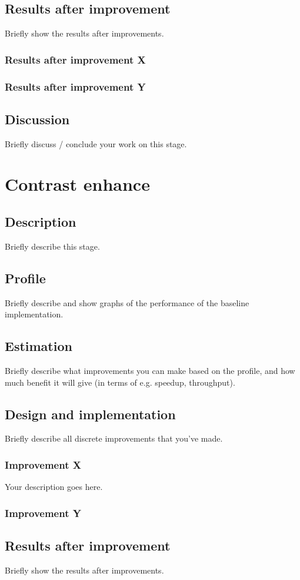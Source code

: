 \documentclass[twocolumn]{article}
\begin{document}
\subsection{Results after improvement}
Briefly show the results after improvements.
\subsubsection{Results after improvement X}
\subsubsection{Results after improvement Y}
\subsection{Discussion}
Briefly discuss / conclude your work on this stage.

\section{Contrast enhance}
\subsection{Description}
Briefly describe this stage.
\subsection{Profile}
Briefly describe and show graphs of the performance of the baseline implementation.
\subsection{Estimation}
Briefly describe what improvements you can make based on the profile, and how much benefit it will give (in terms of e.g. speedup, throughput).
\subsection{Design and implementation}
Briefly describe all discrete improvements that you've made.
\subsubsection{Improvement X}
Your description goes here.
\subsubsection{Improvement Y}
\subsection{Results after improvement}
Briefly show the results after improvements.
\end{document}
